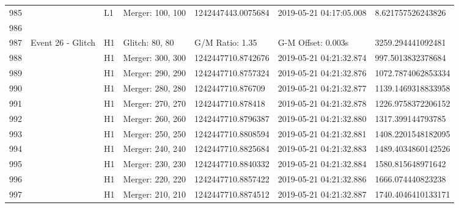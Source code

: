 \begin{longtable}{lllllll}
985  &                                                    &       L1 &  Merger: 100, 100 &  1242447443.0075684 &  2019-05-21 04:17:05.008 &   8.621757526243826 \\
986  &                                                    &          &                   &                     &                          &                     \\
987  &                                  Event 26 - Glitch &       H1 &    Glitch: 80, 80 &     G/M Ratio: 1.35 &       G-M Offset: 0.003s &   3259.294441092481 \\
988  &                                                    &       H1 &  Merger: 300, 300 &  1242447710.8742676 &  2019-05-21 04:21:32.874 &   997.5013832378684 \\
989  &                                                    &       H1 &  Merger: 290, 290 &  1242447710.8757324 &  2019-05-21 04:21:32.876 &  1072.7874062853334 \\
990  &                                                    &       H1 &  Merger: 280, 280 &   1242447710.876709 &  2019-05-21 04:21:32.877 &  1139.1469318833958 \\
991  &                                                    &       H1 &  Merger: 270, 270 &   1242447710.878418 &  2019-05-21 04:21:32.878 &  1226.9758372206152 \\
992  &                                                    &       H1 &  Merger: 260, 260 &  1242447710.8796387 &  2019-05-21 04:21:32.880 &   1317.399144793785 \\
993  &                                                    &       H1 &  Merger: 250, 250 &  1242447710.8808594 &  2019-05-21 04:21:32.881 &  1408.2201548182095 \\
994  &                                                    &       H1 &  Merger: 240, 240 &  1242447710.8825684 &  2019-05-21 04:21:32.883 &  1489.4034860142526 \\
995  &                                                    &       H1 &  Merger: 230, 230 &  1242447710.8840332 &  2019-05-21 04:21:32.884 &   1580.815648971642 \\
996  &                                                    &       H1 &  Merger: 220, 220 &  1242447710.8857422 &  2019-05-21 04:21:32.886 &   1666.074440823238 \\
997  &                                                    &       H1 &  Merger: 210, 210 &  1242447710.8874512 &  2019-05-21 04:21:32.887 &  1740.4046410133171 \\

\end{longtable}
